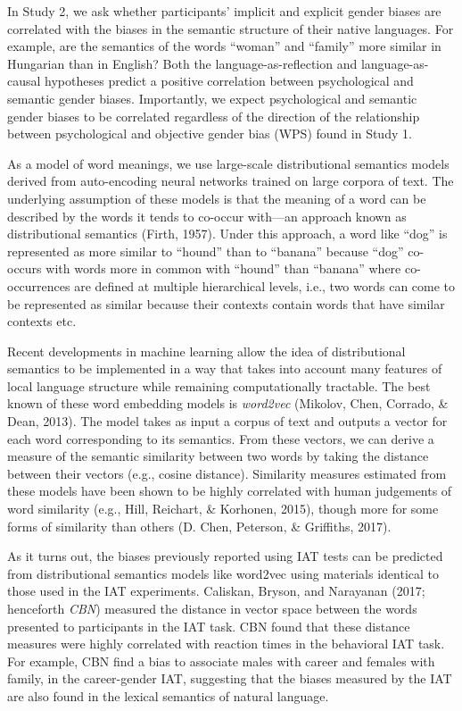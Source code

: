 \documentclass[10pt, letterpaper]{article}
\begin{document}
In Study 2, we ask whether participants' implicit and explicit gender
biases are correlated with the biases in the semantic structure of their
native languages. For example, are the semantics of the words ``woman''
and ``family'' more similar in Hungarian than in English? Both the
language-as-reflection and language-as-causal hypotheses predict a
positive correlation between psychological and semantic gender biases.
Importantly, we expect psychological and semantic gender biases to be
correlated regardless of the direction of the relationship between
psychological and objective gender bias (WPS) found in Study 1.

As a model of word meanings, we use large-scale distributional semantics
models derived from auto-encoding neural networks trained on large
corpora of text. The underlying assumption of these models is that the
meaning of a word can be described by the words it tends to co-occur
with---an approach known as distributional semantics (Firth, 1957).
Under this approach, a word like ``dog'' is represented as more similar
to ``hound'' than to ``banana'' because ``dog'' co-occurs with words
more in common with ``hound'' than ``banana'' where co-occurrences are
defined at multiple hierarchical levels, i.e., two words can come to be
represented as similar because their contexts contain words that have
similar contexts etc.

Recent developments in machine learning allow the idea of distributional
semantics to be implemented in a way that takes into account many
features of local language structure while remaining computationally
tractable. The best known of these word embedding models is
\emph{word2vec} (Mikolov, Chen, Corrado, \& Dean, 2013). The model takes
as input a corpus of text and outputs a vector for each word
corresponding to its semantics. From these vectors, we can derive a
measure of the semantic similarity between two words by taking the
distance between their vectors (e.g., cosine distance). Similarity
measures estimated from these models have been shown to be highly
correlated with human judgements of word similarity (e.g., Hill,
Reichart, \& Korhonen, 2015), though more for some forms of similarity
than others (D. Chen, Peterson, \& Griffiths, 2017).

As it turns out, the biases previously reported using IAT tests can be
predicted from distributional semantics models like word2vec using
materials identical to those used in the IAT experiments. Caliskan,
Bryson, and Narayanan (2017; henceforth \emph{CBN}) measured the
distance in vector space between the words presented to participants in
the IAT task. CBN found that these distance measures were highly
correlated with reaction times in the behavioral IAT task. For example,
CBN find a bias to associate males with career and females with family,
in the career-gender IAT, suggesting that the biases measured by the IAT
are also found in the lexical semantics of natural language.
\end{document}
